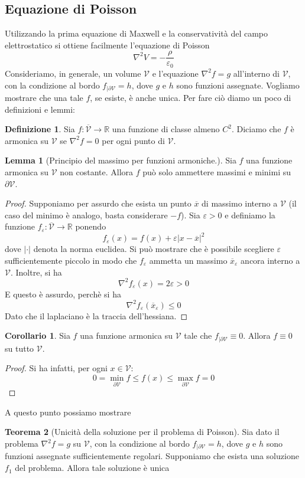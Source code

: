 \documentclass[a4paper,11pt]{book}
\let\oldnabla\nabla
\renewcommand{\nabla}{\vec{\oldnabla}}
\newcommand{\R}{\mathbb{R}}
\newcommand{\lap}{\oldnabla^2}
\let\oldepsilon\epsilon
\let\oldvarepsilon\varepsilon
\renewcommand{\epsilon}{\oldvarepsilon}
\renewcommand{\varepsilon}{\oldepsilon}
\newcommand{\V}{\mathcal{V}}
\theoremstyle{definition}
\newtheorem{definizione}{Definizione}[section]
\theoremstyle{theorem}
\newtheorem{teorema}{Teorema}[section]
\newtheorem{corollario}{Corollario}[teorema]
\newtheorem{lemma}[teorema]{Lemma}
\begin{document}
	\subsection{Equazione di Poisson}
	Utilizzando la prima equazione di Maxwell e la conservatività del campo elettrostatico si ottiene facilmente l'equazione di Poisson
	\[\lap V=-\frac{\rho}{\epsilon_0}\]
	Consideriamo, in generale, un volume $\mathcal{V}$ e l'equazione $\lap f=g$ all'interno di $\mathcal{V}$, con la condizione al bordo $f_{|\partial \mathcal{V}}=h$, dove $g$ e $h$ sono funzioni assegnate. Vogliamo mostrare che una tale $f$, se esiste, è anche unica. Per fare ciò diamo un poco di definizioni e lemmi:
	\begin{definizione}
		Sia $f\colon\overline{\mathcal{V}}\to\R$ una funzione di classe almeno $C^2$. Diciamo che $f$ è armonica su $\mathcal{V}$ se $\lap f=0$ per ogni punto di $\mathcal{V}$.
	\end{definizione}
	\begin{lemma}[Principio del massimo per funzioni armoniche.] Sia $f$ una funzione armonica su $\V$ non costante. Allora $f$ può solo ammettere massimi e minimi su $\partial\mathcal{V}$.
	\end{lemma}
	\begin{proof}
		Supponiamo per assurdo che esista un punto $\overline{x}$ di massimo interno a $\V$ (il caso del minimo è analogo, basta considerare $-f$). Sia $\epsilon>0$ e definiamo la funzione $f_\epsilon\colon\overline{\V}\to\R$ ponendo
		\[f_\epsilon(x)=f(x)+\epsilon|x-\overline{x}|^2\]
		dove $|\cdot|$ denota la norma euclidea. Si può mostrare che è possibile scegliere $\epsilon$ sufficientemente piccolo in modo che $f_\epsilon$ ammetta un massimo $\overline{x}_\epsilon$ ancora interno a $\V$. Inoltre, si ha
		\[\lap f_\epsilon(x)=2\epsilon>0\]
		E questo è assurdo, perchè si ha
		\[\lap f_\epsilon(\overline{x}_\epsilon)\leq0\]
		Dato che il laplaciano è la traccia dell'hessiana.
	\end{proof}
	\begin{corollario}
		Sia $f$ una funzione armonica su $\mathcal{V}$ tale che $f_{|\partial\mathcal{V}}\equiv0$. Allora $f\equiv0$ su tutto $\mathcal{V}$.
	\end{corollario}
	\begin{proof}
		Si ha infatti, per ogni $x\in\mathcal{V}$:
		\[0=\min_{\partial\mathcal{V}}f\leq f(x)\leq\max_{\partial\mathcal{V}}f=0\]
	\end{proof}
	A questo punto possiamo mostrare
	\begin{teorema}[Unicità della soluzione per il problema di Poisson]
		Sia dato il problema $\lap f=g$ su $\mathcal{V}$, con la condizione al bordo $f_{|\partial\mathcal{V}}=h$, dove $g$ e $h$ sono funzioni assegnate sufficientemente regolari. Supponiamo che esista una soluzione $f_1$ del problema. Allora tale soluzione è unica
	\end{teorema}
\end{document}
